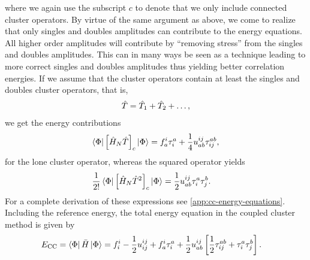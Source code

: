             where we again use the subscript $c$ to denote that we only include
            connected cluster operators.
            By virtue of the same argument as above, we come to realize that
            only singles and doubles amplitudes can contribute to the energy
            equations.
            All higher order amplitudes will contribute by ``removing stress''
            from the singles and doubles amplitudes.
            This can in many ways be seen as a technique leading to more correct
            singles and doubles amplitudes thus yielding better correlation
            energies.
            If we assume that the cluster operators contain at least the
            singles and doubles cluster operators, that is,
            \begin{align}
                \hat{T} = \hat{T}_1 + \hat{T}_2 + \dots,
            \end{align}
            we get the energy contributions
            \begin{align}
                \bra{\Phi}\left[ 
                    \hat{H}_N \hat{T}
                 \right]_c\ket{\Phi}
                =
                f^{i}_{a}\tau^{a}_{i}
                +
                \frac{1}{4}u^{ij}_{ab} \tau^{ab}_{ij},
                \label{eq:cc-energy-linear-contrib}
            \end{align}
            for the lone cluster operator, whereas the squared operator yields
            \begin{align}
                \frac{1}{2!}\bra{\Phi}\left[ 
                    \hat{H}_N \hat{T}^2
                 \right]_c\ket{\Phi}
                &=
                \frac{1}{2} u^{ij}_{ab}\tau^{a}_{i}\tau^{b}_{j}.
                \label{eq:cc-energy-squared-contrib}
            \end{align}
            For a complete derivation of these expressions see
            \autoref{app:cc-energy-equations}.
            Including the reference energy, the total energy equation in the
            coupled cluster method is given by
            \begin{align}
                E_{\text{CC}}
                &= \bra{\Phi}\bar{H}\ket{\Phi}
                =
                f^{i}_{i}
                - \frac{1}{2} u^{ij}_{ij}
                + f^{i}_{a}\tau^{a}_{i}
                + \frac{1}{2}u^{ij}_{ab}\left[ 
                    \frac{1}{2}\tau^{ab}_{ij}
                    + \tau^{a}_{i}\tau^{b}_{j}
                 \right].
                \label{eq:cc-energy-equation}
            \end{align}
